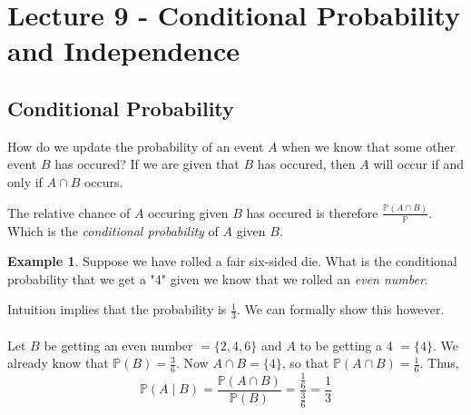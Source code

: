 \documentclass{report}
\theoremstyle{definition}
\newtheorem{definition}{Definition}
\newtheorem{example}{Example}
\theoremstyle{plain}
\theoremstyle{remark}
\begin{document}
\section{Lecture 9 - Conditional Probability and Independence}
\subsection{Conditional Probability}
How do we update the probability of an event $ A $ when we know that some other
event $ B $ has occured? If we are given that $ B $ has occured, then
$ A $ will occur if and only if $ A \cap B $ occurs.
\par The relative chance of $ A $ occuring given $ B $ has occured is therefore
$ \displaystyle \frac{\mathbb{P}(A \cap B)}{\mathbb{P}} $. Which is the
\textit{conditional probability} of $ A $ given $ B $.
\begin{center}
\end{center}
\begin{example}
Suppose we have rolled a fair six-sided die. What is the conditional
probability that we get a "4" given we know that we rolled an \textit{even
number}.
\end{example}
Intuition implies that the probability is $ \displaystyle \frac{1}{3} $. We can
formally show this however.
\\\\
Let $ B $ be getting an even number $ = \{2,4,6\} $ and
$ A $ to be getting a 4 $ = \{4\} $. We already know that $ \mathbb{P}(B)
= \frac{3}{6} $. Now $ A \cap B = \{4\} $, so that $ \mathbb{P}(A \cap B)
= \frac{1}{6} $. Thus,
$$ \mathbb{P}(A\mid B) = \frac{\mathbb{P}(A\cap B)}{\mathbb{P}(B)}
= \frac{\frac{1}{6}}{ \frac{3}{6}} = \frac{1}{3} $$
\end{document}
